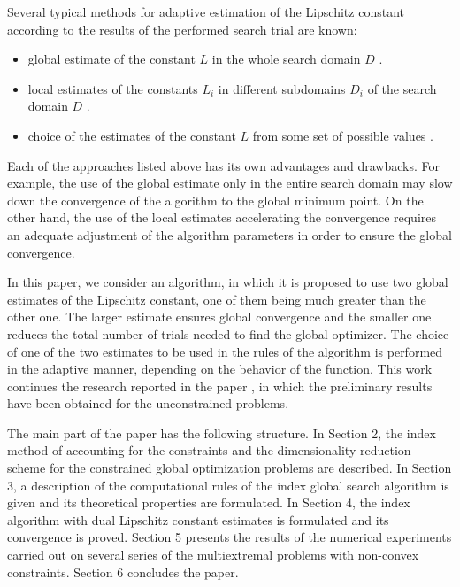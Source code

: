 \documentclass[review]{elsarticle}
\begin{document}
		Several typical methods for adaptive estimation of the Lipschitz constant according to the results of the performed search trial are known:
\begin{itemize}[]
  \item global estimate of the constant $L$ in the whole search domain $D$ \cite{Horst1996, Pinter1996, Strongin2000}.
  \item local estimates of the constants $L_i$ in different subdomains $D_i$ of the search domain $D$ \cite{Kvasov2003, Sergeyev2010, Sergeyev2016}.
	\item choice of the estimates of the constant $L$ from some set of possible values \cite{Gablonsky2001, Jones1993, Jones2009, Sergeyev2006}.
\end{itemize}

	Each of the approaches listed above has its own advantages and drawbacks. For example, the use of the global estimate only in the entire search domain may slow down the convergence of the algorithm to the global minimum point. On the other hand, the use of the local estimates accelerating the convergence requires an adequate adjustment of the algorithm parameters in order to ensure the global convergence. 

	In this paper, we consider an algorithm, in which it is proposed to use two global estimates of the Lipschitz constant, one of them being much greater than the other one. The larger estimate ensures global convergence and the smaller one reduces the total number of trials needed to find the global optimizer. The choice of one of the two estimates to be used in the rules of the algorithm is performed in the adaptive manner, depending on the behavior of the function. This work continues the research reported in the paper 
	\cite{NUMTA2019},
in which the preliminary results have been obtained for the unconstrained problems.
	
	The main part of the paper has the following structure. In Section 2, the index method of accounting for the constraints and the dimensionality reduction scheme for the constrained global optimization problems are described. In Section 3, a description of the computational rules of the index global search algorithm is given and its theoretical properties are formulated. In Section 4, the index algorithm with dual Lipschitz constant estimates is formulated and its convergence is proved. Section 5 presents the results of the numerical experiments carried out on several series of the multiextremal problems with non-convex constraints. Section 6 concludes the paper.
\end{document}
